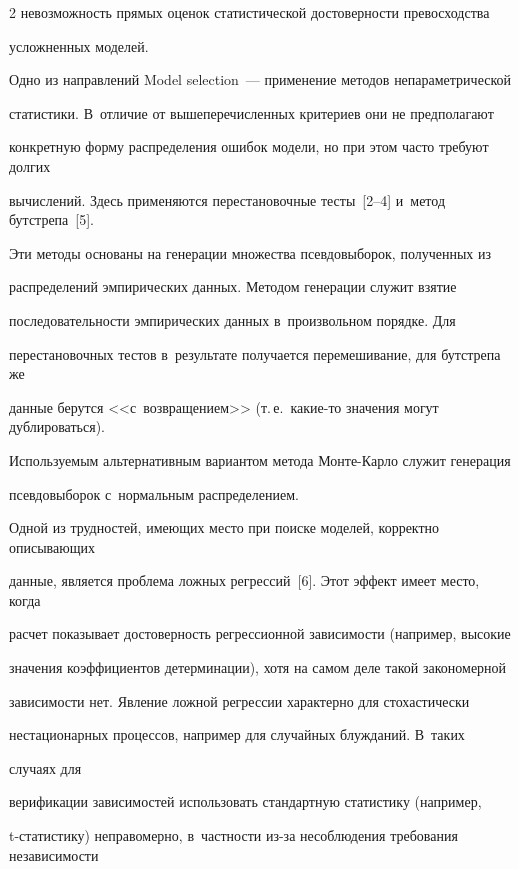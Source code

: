 \begin{multicols}{2}
невозможность прямых оценок статистической до\-сто\-вер\-ности превосходства 


усложненных моделей.


  


  Одно из направлений Model selection~--- применение методов непараметрической 


статистики. В~отличие от вышеперечисленных критериев они не предполагают 


конкретную форму распределения ошибок модели, но при этом часто требуют долгих 


вычислений. Здесь применяются перестановочные тесты~[2--4] и~метод бутстрепа~[5]. 


Эти методы основаны на генерации множества псевдовыборок, полученных из 


распределений эмпирических данных. Методом генерации служит взятие 


последовательности эмпирических данных в~произвольном порядке. Для 


перестановочных тестов в~результате получается перемешивание, для бутстрепа же 


данные берутся <<с~возвращением>> (т.\,е.\ ка\-кие-то значения могут дублироваться). 


Используемым альтернативным вариантом метода Монте-Карло служит генерация 


псевдовыборок с~нормальным распределением.


  


  Одной из трудностей, имеющих место при поиске моделей, корректно описывающих 


данные, является проблема ложных регрессий~[6]. Этот эффект имеет место, когда 


расчет показывает достоверность регрессионной зависимости (например, высокие 


значения коэффициентов детерминации), хотя на самом деле такой закономерной 


зависимости нет. Явление ложной регрессии характерно для стохастически 


нестационарных процессов, например для случайных блужданий. В~таких\linebreak


 случаях для 


верификации зависимостей использовать стандартную статистику (например, 


t-ста\-ти\-сти\-ку) неправомерно, в~част\-ности из-за несоблюдения требования независимости 



\end{multicols}
